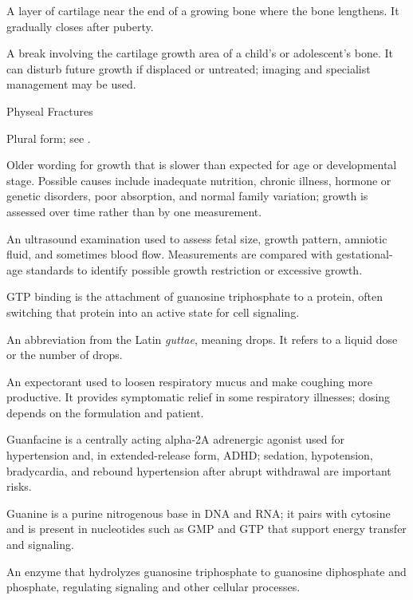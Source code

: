  A layer of cartilage near the end of a growing bone where the bone lengthens. It gradually closes after puberty.

 A break involving the cartilage growth area of a child’s or adolescent’s bone. It can disturb future growth if displaced or untreated; imaging and specialist management may be used.

\synonyms
Physeal Fractures

 Plural form; see .

 Older wording for growth that is slower than expected for age or developmental stage. Possible causes include inadequate nutrition, chronic illness, hormone or genetic disorders, poor absorption, and normal family variation; growth is assessed over time rather than by one measurement.

 An ultrasound examination used to assess fetal size, growth pattern, amniotic fluid, and sometimes
blood flow. Measurements are compared with gestational-age standards to identify possible growth restriction or excessive
growth.

 GTP binding is the attachment of guanosine triphosphate to a protein, often switching that protein into an active state for cell signaling.

 An abbreviation from the Latin \textit{guttae}, meaning drops. It refers to a liquid dose or the number of drops.

 An expectorant used to loosen respiratory mucus and make coughing more productive. It provides
symptomatic relief in some respiratory illnesses; dosing depends on the formulation and patient.

 Guanfacine is a centrally acting alpha-2A adrenergic agonist used for hypertension and, in extended-release form, ADHD; sedation, hypotension, bradycardia, and rebound hypertension after abrupt withdrawal are important risks.

 Guanine is a purine nitrogenous base in DNA and RNA; it pairs with cytosine and is present in nucleotides such as GMP and GTP that support energy transfer and signaling.

 An enzyme that hydrolyzes guanosine triphosphate to guanosine diphosphate and phosphate, regulating signaling and other cellular processes.

